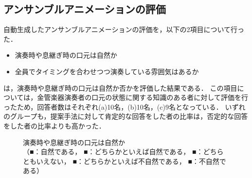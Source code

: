 \subsection{アンサンブルアニメーションの評価}
自動生成したアンサンブルアニメーションの評価を，以下の2項目について行った．
\begin{itemize}
	\item 演奏時や息継ぎ時の口元は自然か
	\item 全員でタイミングを合わせつつ演奏している雰囲気はあるか
\end{itemize}
\vspace{5mm}
\par
{}は，演奏時や息継ぎ時の口元は自然か否かを評価した結果である．
この項目については，金管楽器演奏者の口元の状態に関する知識のある者に対して評価を行ったため，回答者数はそれぞれ(a)10名，(b)10名，(c)9名となっている．
いずれのグループも，提案手法に対して肯定的な回答をした者の比率は，否定的な回答をした者の比率よりも高かった．
\begin{figure}[!h]
	\centering
	\hspace{5mm}
	\hspace{5mm}
	\caption{演奏時や息継ぎ時の口元は自然か\\
		（{\color{legend1}■}：自然である，
		{\color{legend2}■}：どちらかといえば自然である，
		{\color{legend3}■}：どちらともいえない，
		{\color{legend4}■}：どちらかといえば不自然である，
		{\color{legend5}■}：不自然である）}
	\label{fig:Q3-1}
\end{figure}
